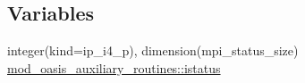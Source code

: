 \subsection*{Variables}
\begin{DoxyCompactItemize}
\item 
integer(kind=ip\+\_\+i4\+\_\+p), dimension(mpi\+\_\+status\+\_\+size) \hyperlink{namespacemod__oasis__auxiliary__routines_a284fcb0384dbbf081a6930256fc12b27}{mod\+\_\+oasis\+\_\+auxiliary\+\_\+routines\+::istatus}
\end{DoxyCompactItemize}
